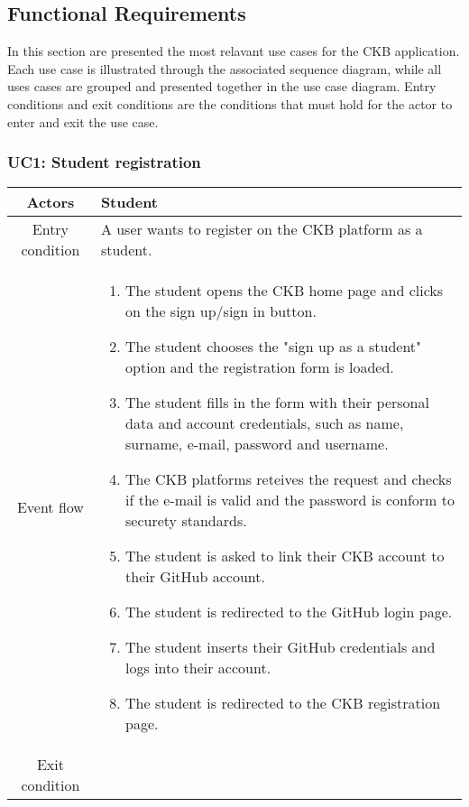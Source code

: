 \documentclass[a4paper, 11pt, titlepage]{article}
\begin{document}
\subsection{Functional Requirements}
In this section are presented the most relavant use cases for the CKB application.
Each use case is illustrated through the associated sequence diagram, while all uses cases are grouped and presented together in
the use case diagram. Entry conditions and exit conditions are the conditions that must hold for the actor to enter and exit the use case.  

\subsubsection*{UC1: Student registration}

\begin{center}
    \begin{tabularx}{\linewidth} {|c|X|}
        \hline
        Actors & Student\\
        \hline
        Entry condition & 
            A user wants to register on the CKB platform as a student.\\
        \hline
        Event flow & 
        \begin{enumerate}
            \item The student opens the CKB home page and clicks on the sign up/sign in button.
            \item The student chooses the "sign up as a student" option and the registration form is loaded.
            \item The student fills in the form with their personal data and account credentials, such as name, surname, e-mail, password and username.
            \item The CKB platforms reteives the request and checks if the e-mail is valid and the password is conform to securety standards.
            \item The student is asked to link their CKB account to their GitHub account.
            \item The student is redirected to the GitHub login page.
            \item The student inserts their GitHub credentials and logs into their account.
            \item The student is redirected to the CKB registration page.  
        \end{enumerate}\\
        \hline
        Exit condition &

\end{tabularx}
\end{center}
\end{document}
